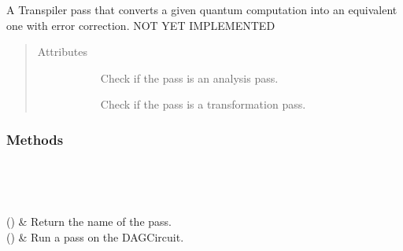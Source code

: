 \documentclass[letterpaper,10pt,english]{sphinxmanual}
\begin{document}
\begin{fulllineitems}
\label{\detokenize{Base:BaseFaultTolerance.FaultTolerance}}
\sphinxAtStartPar
A Transpiler pass that converts a given quantum computation into an equivalent one with error correction. NOT YET IMPLEMENTED
\begin{quote}\begin{description}
\item[{Attributes}] \leavevmode\begin{description}
\item[{}] \leavevmode
\sphinxAtStartPar
Check if the pass is an analysis pass.

\item[{}] \leavevmode
\sphinxAtStartPar
Check if the pass is a transformation pass.

\end{description}

\end{description}\end{quote}
\subsubsection*{Methods}


\begin{savenotes}\sphinxatlongtablestart\begin{longtable}[c]{}
\hline

\endfirsthead

%
{}\\
\hline

\endhead

\hline
{}\\
\endfoot

\endlastfoot

\sphinxAtStartPar
{}()
&
\sphinxAtStartPar
Return the name of the pass.
\\
\hline
\sphinxAtStartPar
{\hyperref[\detokenize{Base:BaseFaultTolerance.FaultTolerance.run}]{}}()
&
\sphinxAtStartPar
Run a pass on the DAGCircuit.
\\
\hline
\end{longtable}\sphinxatlongtableend\end{savenotes}


\end{fulllineitems}
\end{document}
